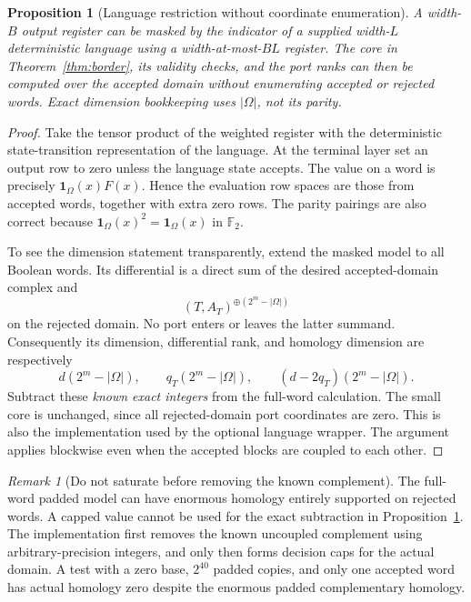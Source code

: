 \documentclass[11pt,letterpaper]{article}
\newcommand{\F}{{\mathbb F_2}}
\newtheorem{proposition}[theorem]{Proposition}
\theoremstyle{definition}
\theoremstyle{remark}
\newtheorem{remark}[theorem]{Remark}
\numberwithin{equation}{section}
\begin{document}
\begin{proposition}[Language restriction without coordinate enumeration]
\label{prop:language}
A width-$B$ output register can be masked by the indicator of a supplied
width-$L$ deterministic language using a width-at-most-$BL$ register.
The core in Theorem~\ref{thm:border}, its validity checks, and the port
ranks can then be computed over the accepted domain without enumerating
accepted or rejected words. Exact dimension bookkeeping uses $|\Omega|$,
not its parity.
\end{proposition}
\begin{proof}
Take the tensor product of the weighted register with the deterministic
state-transition representation of the language. At the terminal layer
set an output row to zero unless the language state accepts. The value
on a word is precisely $\mathbf 1_\Omega(x)F(x)$. Hence the evaluation
row spaces are those from accepted words, together with extra zero rows.
The parity pairings are also correct because
$\mathbf 1_\Omega(x)^2=\mathbf 1_\Omega(x)$ in $\F$.

To see the dimension statement transparently, extend the masked model to
all Boolean words. Its differential is a direct sum of the desired
accepted-domain complex and
\[
 (T,A_T)^{\oplus(2^m-|\Omega|)}
\]
on the rejected domain. No port enters or leaves the latter summand.
Consequently its dimension, differential rank, and homology dimension
are respectively
\[
 d(2^m-|\Omega|),\qquad q_T(2^m-|\Omega|),\qquad
 (d-2q_T)(2^m-|\Omega|).
\]
Subtract these \emph{known exact integers} from the full-word calculation.
The small core is unchanged, since all rejected-domain port coordinates
are zero. This is also the implementation used by the optional language
wrapper. The argument applies blockwise even when the accepted blocks
are coupled to each other.
\end{proof}

\begin{remark}[Do not saturate before removing the known complement]
The full-word padded model can have enormous homology entirely supported
on rejected words. A capped value cannot be used for the exact subtraction
in Proposition~\ref{prop:language}. The implementation first removes the
known uncoupled complement using arbitrary-precision integers, and only
then forms decision caps for the actual domain. A test with a zero base,
$2^{40}$ padded copies, and only one accepted word has actual homology
zero despite the enormous padded complementary homology.
\end{remark}
\end{document}
